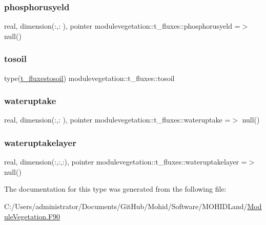 \subsubsection{\texorpdfstring{phosphorusyeld}{phosphorusyeld}}
{\footnotesize\ttfamily real, dimension(\+:,\+:  ), pointer modulevegetation\+::t\+\_\+fluxes\+::phosphorusyeld =$>$ null()\hspace{0.3cm}{\ttfamily [private]}}

\mbox{\label{structmodulevegetation_1_1t__fluxes_aa30a2bd30e3a1b88abb8405cebdd7cba}} 
\subsubsection{\texorpdfstring{tosoil}{tosoil}}
{\footnotesize\ttfamily type(\mbox{\hyperlink{structmodulevegetation_1_1t__fluxestosoil}{t\+\_\+fluxestosoil}}) modulevegetation\+::t\+\_\+fluxes\+::tosoil\hspace{0.3cm}{\ttfamily [private]}}

\mbox{\label{structmodulevegetation_1_1t__fluxes_acca5f1277259cd9c92ebc60c695dd4b2}} 
\subsubsection{\texorpdfstring{wateruptake}{wateruptake}}
{\footnotesize\ttfamily real, dimension(\+:,\+:  ), pointer modulevegetation\+::t\+\_\+fluxes\+::wateruptake =$>$ null()\hspace{0.3cm}{\ttfamily [private]}}

\mbox{\label{structmodulevegetation_1_1t__fluxes_a51a2312d2a3f914ca3a6f152e7f43d29}} 
\subsubsection{\texorpdfstring{wateruptakelayer}{wateruptakelayer}}
{\footnotesize\ttfamily real, dimension(\+:,\+:,\+:), pointer modulevegetation\+::t\+\_\+fluxes\+::wateruptakelayer =$>$ null()\hspace{0.3cm}{\ttfamily [private]}}



The documentation for this type was generated from the following file\+:\begin{DoxyCompactItemize}
\item 
C\+:/\+Users/administrator/\+Documents/\+Git\+Hub/\+Mohid/\+Software/\+M\+O\+H\+I\+D\+Land/\mbox{\hyperlink{_module_vegetation_8_f90}{Module\+Vegetation.\+F90}}\end{DoxyCompactItemize}
